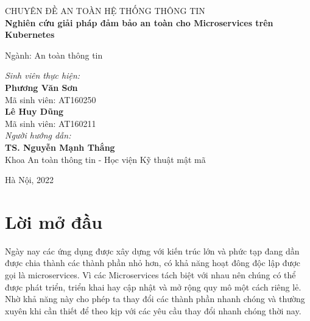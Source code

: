 \documentclass[12pt,a4paper]{report}
\begin{document}
\begin{titlepage}
	
	\begin{center}
		{\large CHUYÊN ĐỀ AN TOÀN HỆ THỐNG THÔNG TIN\\}
		\Huge{\textbf{Nghiên cứu giải pháp đảm bảo an toàn cho Microservices trên Kubernetes}}
	\end{center}
	\bigskip
	\begin{flushright}
		\large{Ngành: An toàn thông tin}
	\end{flushright}
	\vspace{15mm}
	\begin{flushleft}
		\textit{Sinh viên thực hiện:}\\
		\textbf{Phương Văn Sơn}\\
		Mã sinh viên: AT160250\\
		\textbf{Lê Huy Dũng}\\
		Mã sinh viên: AT160211
		\bigskip\\
		\textit{Người hướng dẫn:}\\
		\textbf{TS. Nguyễn Mạnh Thắng}\\
		Khoa An toàn thông tin - Học viện Kỹ thuật mật mã
	\end{flushleft}
	\vfill
	\begin{center}
		Hà Nội, 2022
	\end{center}
	
\end{titlepage}
	
\chapter*{\centering Lời mở đầu}
\setcounter{page}{2}
\hspace{0.6cm}{Nhiều năm trước, hầu hết các ứng dụng phần mềm đều được xây dựng với kiến trúc monolith hay còn gọi là kiến trúc 1 khối là mẫu thiết kế được dùng nhiều nhất trong giới lập trình web hiện nay bởi tính đơn giản của nó khi phát triển và khi triển khai. Các ứng dụng này chạy dưới dạng một tiến trình đơn lẻ hoặc số lượng nhỏ các tiến trình trên một số ít máy chủ. Chúng có khả năng cập nhật và nâng cấp chậm và yêu cầu nâng cấp thường xuyên. Trong trường hợp có sự cố như lỗi phần cứng hệ thống phần mềm này sẽ phải được di chuyển một cách thủ công sang các máy chủ còn hoạt động tốt.\\}

Ngày nay các ứng dụng được xây dựng với kiến trúc lớn và phức tạp đang dần được chia thành các thành phần nhỏ hơn, có khả năng hoạt đông độc lập được gọi là microservices. Vì các Microservices tách biệt với nhau nên chúng có thể được phát triển, triển khai hay cập nhật và mở rộng quy mô một cách riêng lẻ. Nhờ khả năng này cho phép ta thay đổi các thành phần nhanh chóng và thường xuyên khi cần thiết để theo kịp với các yêu cầu thay đổi nhanh chóng thời nay.\\
\end{document}
